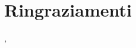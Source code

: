 \cleardoublepage
{}

\begingroup
\let\clearpage\relax
\let\cleardoublepage\relax
\let\cleardoublepage\relax

\chapter*{Ringraziamenti}
\bigskip

\noindent\textit{\myLocation, \myTime}
\hfill \myName

\endgroup

